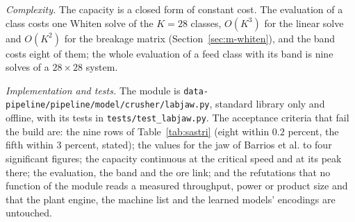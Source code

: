 \emph{Complexity.} The capacity is a closed form of constant cost. The evaluation of a class costs one Whiten solve of the $K=28$ classes, $O(K^3)$ for the linear solve and $O(K^2)$ for the breakage matrix (Section~\ref{sec:m-whiten}), and the band costs eight of them; the whole evaluation of a feed class with its band is nine solves of a $28\times28$ system.

\emph{Implementation and tests.} The module is \texttt{data-pipeline/\allowbreak{}pipeline/\allowbreak{}model/\allowbreak{}crusher/\allowbreak{}labjaw.py}, standard library only and offline, with its tests in \texttt{tests/\allowbreak{}test\_labjaw.py}. The acceptance criteria that fail the build are: the nine rows of Table~\ref{tab:sastri} (eight within $0.2$ percent, the fifth within $3$ percent, stated); the values for the jaw of Barrios et al. to four significant figures; the capacity continuous at the critical speed
and at its peak there; the evaluation, the band and the ore link; and the refutations that no function of the module reads a measured throughput, power or product size and that the plant engine, the machine list and the learned models' encodings are untouched.
